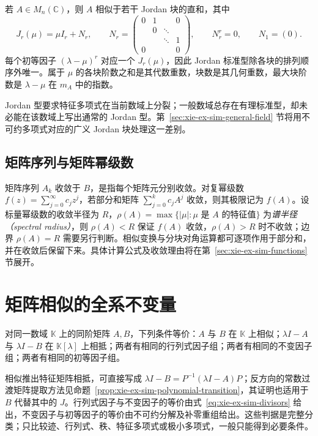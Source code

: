 \begin{theorem}
\label{thm:xie-ex-sim-jordan}
若 $A\in M_n(\mathbb C)$，则 $A$ 相似于若干 Jordan 块的直和，其中
\[
 J_r(\mu)=\mu I_r+N_r,
 \qquad
 N_r=\begin{pmatrix}
 0&1&&0\\
 &0&\ddots&\\
 &&\ddots&1\\
 0&&&0
 \end{pmatrix},
 \qquad N_r^r=0,
 \qquad N_1=(0).
\]
每个初等因子 $(\lambda-\mu)^r$ 对应一个 $J_r(\mu)$，因此 Jordan 标准型除各块的排列顺序外唯一。属于 $\mu$ 的各块阶数之和是其代数重数，块数是其几何重数，最大块阶数是 $\lambda-\mu$ 在 $m_A$ 中的指数。
\end{theorem}

Jordan 型要求特征多项式在当前数域上分裂；一般数域总存在有理标准型，却未必能在该数域上写出通常的 Jordan 型。第~\ref{sec:xie-ex-sim-general-field} 节将用不可约多项式对应的广义 Jordan 块处理这一差别。

\subsection{矩阵序列与矩阵幂级数}

矩阵序列 $A_k$ 收敛于 $B$，是指每个矩阵元分别收敛。对复幂级数 $f(z)=\sum_{j=0}^{\infty}c_jz^j$，若部分和矩阵 $\sum_{j=0}^{k}c_jA^j$ 收敛，则其极限记为 $f(A)$。设标量幂级数的收敛半径为 $R$，$\rho(A)=\max\{|\mu|:\mu\text{ 是 }A\text{ 的特征值}\}$ 为\emph{谱半径（spectral radius）}，则 $\rho(A)<R$ 保证 $f(A)$ 收敛，$\rho(A)>R$ 时不收敛；边界 $\rho(A)=R$ 需要另行判断。相似变换与分块对角运算都可逐项作用于部分和，并在收敛后保留下来。具体计算公式及收敛理由将在第~\ref{sec:xie-ex-sim-functions} 节展开。

\section{矩阵相似的全系不变量}
\label{sec:xie-ex-sim-invariants}

\begin{theorem}[相似的四种等价判据]
\label{thm:xie-ex-sim-criteria}
对同一数域 $\mathbb K$ 上的同阶矩阵 $A,B$，下列条件等价：$A$ 与 $B$ 在 $\mathbb K$ 上相似；$\lambda I-A$ 与 $\lambda I-B$ 在 $\mathbb K[\lambda]$ 上相抵；两者有相同的行列式因子组；两者有相同的不变因子组；两者有相同的初等因子组。
\end{theorem}

相似推出特征矩阵相抵，可直接写成 $\lambda I-B=P^{-1}(\lambda I-A)P$；反方向的常数过渡矩阵提取方法见命题~\ref{prop:xie-ex-sim-polynomial-transition}，其证明也适用于 $B$ 代替其中的 $J$。行列式因子与不变因子的等价由式~\eqref{eq:xie-ex-sim-divisors} 给出，不变因子与初等因子的等价由不可约分解及补零重组给出。这些判据是完整分类；只比较迹、行列式、秩、特征多项式或极小多项式，一般只能得到必要条件。

